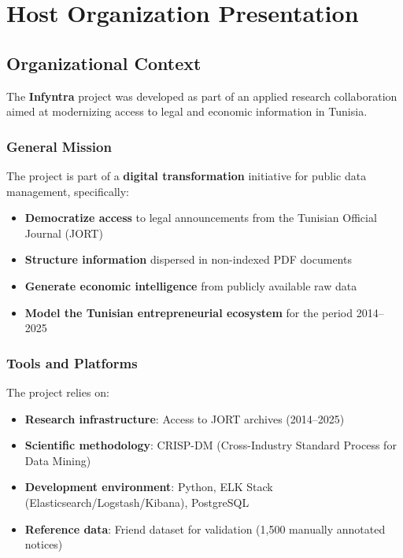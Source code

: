 \documentclass[12pt,a4paper]{report}
\begin{document}
\chapter{Host Organization Presentation}

\section{Organizational Context}

The \textbf{Infyntra} project was developed as part of an applied research collaboration aimed at modernizing access to legal and economic information in Tunisia. 

\subsection{General Mission}

The project is part of a \textbf{digital transformation} initiative for public data management, specifically:

\begin{itemize}
    \item \textbf{Democratize access} to legal announcements from the Tunisian Official Journal (JORT)
    \item \textbf{Structure information} dispersed in non-indexed PDF documents
    \item \textbf{Generate economic intelligence} from publicly available raw data
    \item \textbf{Model the Tunisian entrepreneurial ecosystem} for the period 2014--2025
\end{itemize}

\subsection{Tools and Platforms}

The project relies on:
\begin{itemize}
    \item \textbf{Research infrastructure}: Access to JORT archives (2014--2025)
    \item \textbf{Scientific methodology}: CRISP-DM (Cross-Industry Standard Process for Data Mining)
    \item \textbf{Development environment}: Python, ELK Stack (Elasticsearch/Logstash/Kibana), PostgreSQL
    \item \textbf{Reference data}: Friend dataset for validation (1,500 manually annotated notices)
\end{itemize}
\end{document}
